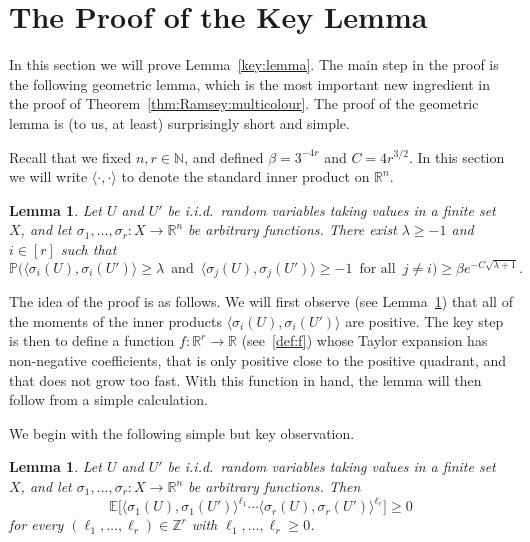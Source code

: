 \documentclass[12pt,reqno]{amsart}
\newtheorem{lemma}[theorem]{Lemma}
\theoremstyle{definition}
\theoremstyle{remark}
\newcommand\N{\mathbb{N}}
\newcommand\R{\mathbb{R}}
\newcommand\Z{\mathbb{Z}}
\def\Pr{\mathbb{P}}
\newcommand\Ex{\mathbb{E}}
\renewcommand{\ge}{\geqslant}
\renewcommand{\to}{\rightarrow}
\def\R{\mathbb{R}}
\def\Z{\mathbb{Z}}
\def\N{\mathbb{N}}
\begin{document}
\section{The Proof of the Key Lemma}\label{sec:key:lemma}

In this section we will prove Lemma~\ref{key:lemma}. The main step in the proof is the following geometric lemma, which is the most important new ingredient in the proof of Theorem~\ref{thm:Ramsey:multicolour}. The proof of the geometric lemma is (to us, at least) surprisingly short and simple. 

Recall that we fixed $n,r \in \N$, and defined $\beta = 3^{-4r}$ and $C = 4r^{3/2}$. In this section we will write $\langle\cdot,\cdot\rangle$ to denote the standard inner product on $\R^n$.  

\begin{lemma}\label{lem:lambda}
Let\/ $U$ and\/ $U'$ be i.i.d.~random variables taking values in a finite set~$X$, and let $\sigma_1,\ldots,\sigma_r \colon X \to \R^n$ be arbitrary functions. There exist $\lambda \ge -1$ and\/ $i \in [r]$ such that
$$\Pr\Big( \big\langle \sigma_i(U),\sigma_i(U') \big\rangle \ge \lambda \, \text{ and } \, \big\langle \sigma_j(U), \sigma_j(U') \big\rangle \ge -1 \, \text{ for all } \, j \ne i \Big) \ge \beta e^{- C\sqrt{\lambda + 1}}.$$
\end{lemma}

The idea of the proof is as follows. We will first observe (see Lemma~\ref{lem:moments}) that all of the moments of the inner products $\langle \sigma_i(U),\sigma_i(U') \rangle$ are positive. The key step is then to define a function $f \colon \R^r \to \R$ (see~\eqref{def:f}) whose Taylor expansion has non-negative coefficients, that is only positive close to the positive quadrant, and that does not grow too fast. With this function in hand, the lemma will then follow from a simple calculation. 

We begin with the following simple but key observation. 

\begin{lemma}\label{lem:moments}
Let $U$ and\/ $U'$ be i.i.d.~random variables taking values in a finite set~$X$, and let\/ $\sigma_1,\ldots,\sigma_r \colon X \to \R^n$ be arbitrary functions. Then
$$\Ex\Big[ \big\langle \sigma_1(U),\sigma_1(U') \big\rangle^{\ell_1} \cdots \big\langle \sigma_r(U),\sigma_r(U') \big\rangle^{\ell_r} \Big] \ge 0$$
for every $(\ell_1,\dots,\ell_r) \in \Z^r$ with $\ell_1,\dots,\ell_r \ge 0$.
\end{lemma}
\end{document}
